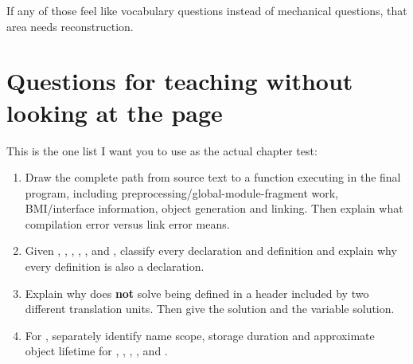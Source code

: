 If any of those feel like vocabulary questions instead of mechanical questions, that area needs reconstruction.

\section{Questions for teaching without looking at the page}\label{01-foundations-i-ch004-questions-for-teaching-without-looking-at-the-page}

\hypertarget{01-foundations-i-ch004-questions-for-teaching-without-looking-at-the-page}{}

This is the one list I want you to use as the actual chapter test:

\begin{enumerate}
\def\labelenumi{\arabic{enumi}.}
\item
  Draw the complete path from  source text to a function executing in the final program, including preprocessing/global-module-fragment work, BMI/interface information, object generation and linking. Then explain what compilation error versus link error means.
\item
  Given , , , , , and , classify every declaration and definition and explain why every definition is also a declaration.
\item
  Explain why  does \textbf{not} solve  being defined in a header included by two different translation units. Then give the  solution and the  variable solution.
\item
  For , separately identify name scope, storage duration and approximate object lifetime for , , , , and .

\end{enumerate}
